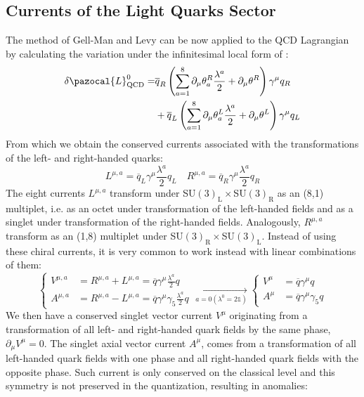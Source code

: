 \documentclass[../main.tex]{subfiles}
\begin{document}
\subsection{Currents of the Light Quarks Sector}
The method of Gell-Man and Levy can be now applied to the QCD Lagrangian by calculating the variation under the infinitesimal local form of :
\begin{align*}    
\delta\pazocal{L}_{\text{QCD}}^0=&\overline{q}_R\left(\sum_{a=1}^8\partial_\mu\theta_a^R\frac{\lambda^a}{2}+\partial_\mu\theta^R\right)\gamma^\mu q_R\\
&+\overline{q}_L\left(\sum_{a=1}^8\partial_\mu\theta_a^L\frac{\lambda^a}{2}+\partial_\mu\theta^L\right)\gamma^\mu q_L
\end{align*}
From which we obtain the conserved currents associated with the transformations of the left- and right-handed quarks:
\[
L^{\mu,a}=\overline{q}_L\gamma^\mu\frac{\lambda^a}{2}q_L \quad R^{\mu,a}=\overline{q}_R\gamma^\mu\frac{\lambda^a}{2}q_R
\]
The eight currents $L^{\mu,a}$ transform under SU$(3)_{\text{L}}\times$SU$(3)_{\text{R}}$ as an (8,1) multiplet, i.e. as an octet under transformation of the left-handed fields and as a singlet under transformation of the right-handed fields. Analogously, $R^{\mu,a}$ transform as an (1,8) multiplet under SU$(3)_{\text{R}}\times$SU$(3)_{\text{L}}$. Instead of using these chiral currents, it is very common to work instead with linear combinations of them:
\[
\left\{
\begin{aligned}
V^{\mu,a}&=R^{\mu,a}+L^{\mu,a}=\overline{q}\gamma^\mu\frac{\lambda^a}{2}q\\
A^{\mu,a}&=R^{\mu,a}-L^{\mu,a}=\overline{q}\gamma^\mu\gamma_5\frac{\lambda^a}{2}q
\end{aligned}
\right.
\xrightarrow[a=0 (\lambda^0=2\mathbb{1})]{}
\left\{
\begin{aligned}
V^\mu&=\overline{q}\gamma^\mu q\\
A^\mu&=\overline{q}\gamma^\mu\gamma_5q
\end{aligned}
\right.
\]
We then have a conserved singlet vector current $V^\mu$ originating from a transformation of all left- and right-handed quark fields by the same phase, $\partial_\mu V^\mu=0$. The singlet axial vector current $A^\mu$, comes from a transformation of all left-handed quark fields with one phase and all right-handed quark fields with the opposite phase. Such current is only conserved on the classical level and this symmetry is not preserved in the quantization, resulting in anomalies:
\end{document}

